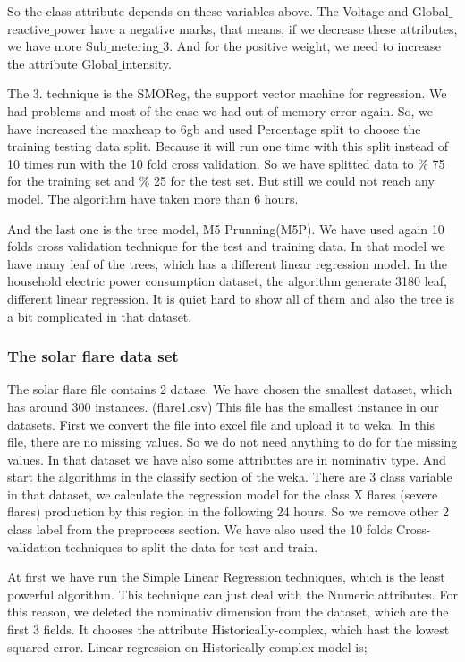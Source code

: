 \documentclass[a4paper]{article}
\begin{document}
So the class attribute depends on these variables above. The Voltage and Global$\_$reactive$\_$power have a negative marks, that means, if we decrease these attributes, we have more Sub$\_$metering$\_$3. And for the positive weight, we need to increase the attribute Global$\_$intensity.

The 3. technique is the SMOReg, the support vector machine for regression. We had problems and most of the case we had out of memory error again. So, we have increased the maxheap to 6gb and used Percentage split to choose the training testing data split. Because it will run one time with this split instead of 10 times run with the 10 fold cross validation. So we have splitted data to $\%$ 75 for the training set and $\%$ 25 for the test set. But still we could not reach any model. The algorithm have taken more than 6 hours.

And the last one is the tree model, M5 Prunning(M5P). We have used again 10 folds cross validation technique for the test and training data. In that model we have many leaf of the trees, which has a different linear regression model. In the household electric power consumption dataset, the algorithm generate 3180 leaf, different linear regression. It is quiet hard to show all of them and also the tree is a bit complicated in that dataset.

\subsubsection{The solar flare data set}
The solar flare file contains 2 datase. We have chosen the smallest dataset, which has around 300 instances. (flare1.csv) This file has the smallest instance in our datasets. First we convert the file into excel file and upload it to weka. In this file, there are no missing values. So we do not need anything to do for the missing values. In that dataset we have also some attributes are in nominativ type. And start the algorithms in the classify section of the weka. There are 3 class variable in that dataset, we calculate the regression model for the class X flares (severe flares) production by this region in the following 24 hours. So we remove other 2 class label from the preprocess section. We have also used the 10 folds Cross-validation techniques to split the data for test and train. 

At first we have run the Simple Linear Regression techniques, which is the least powerful algorithm. This technique can just deal with the Numeric attributes. For this reason, we deleted the nominativ dimension from the dataset, which are the first 3 fields. It chooses the attribute Historically-complex, which hast the lowest squared error. Linear regression on Historically-complex model is; 
\end{document}
